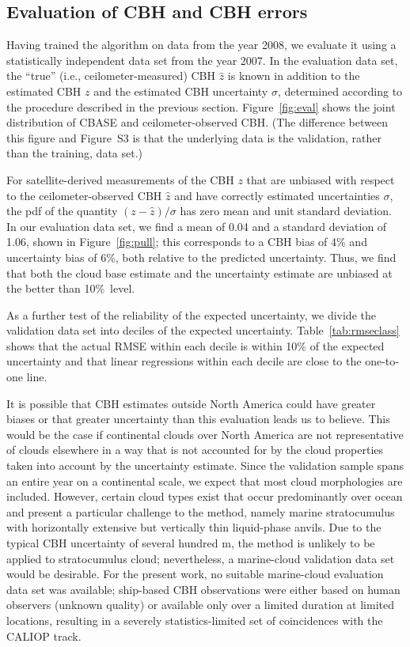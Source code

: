 \documentclass[essd,manuscript]{copernicus}\usepackage[]{graphicx}\usepackage[]{color}
\begin{document}
\subsection{Evaluation of CBH and CBH errors}
\label{sec:algorithm:eval}




Having trained the algorithm on data from the year 2008, we evaluate it using a
statistically independent data set from the year 2007.  In the evaluation data
set, the ``true'' (i.e., ceilometer-measured) CBH $\hat{z}$
is known in addition to the estimated CBH $z$ and the estimated
CBH uncertainty $\sigma$, determined according to the procedure
described in the previous section.  Figure~\ref{fig:eval} shows the joint
distribution of CBASE and ceilometer-observed CBH.  (The
difference between this figure and Figure~S3 is that the underlying data is the
validation, rather than the training, data set.)

For satellite-derived measurements of the CBH $z$ that are
unbiased with respect to the ceilometer-observed CBH $\hat{z}$
and have correctly estimated uncertainties $\sigma$, the pdf of the quantity
$(z - \hat{z})/\sigma$ has zero mean and unit standard deviation. In our
evaluation data set, we find a mean of 0.04 and a standard deviation of 1.06, shown in Figure~\ref{fig:pull}; this
corresponds to a CBH bias of %
4\%
and uncertainty bias of %
6\%, both relative to the predicted uncertainty.  Thus, we find that both
the cloud base estimate and the uncertainty estimate are unbiased at the better
than 10\%\ level.

As a further test of the reliability of the expected uncertainty, we divide the
validation data set into deciles of the expected uncertainty.
Table~\ref{tab:rmseclass} shows that the actual RMSE within each decile is
within 10\% of the expected uncertainty and that linear regressions within each
decile are close to the one-to-one line.

It is possible that CBH estimates outside North America could have
greater biases or that greater uncertainty than this evaluation leads us to
believe.  This would be the case if continental clouds over North America are
not representative of clouds elsewhere in a way that is not accounted for by the
cloud properties taken into account by the uncertainty estimate.  Since the
validation sample spans an entire year on a continental scale, we expect that
most cloud morphologies are included.  However, certain cloud types exist that
occur predominantly over ocean and present a particular challenge to the method,
namely marine stratocumulus with horizontally extensive but vertically thin
liquid-phase anvils.  Due to the typical CBH uncertainty of
several hundred m, the method is unlikely to be applied to stratocumulus cloud;
nevertheless, a marine-cloud validation data set would be desirable.  For the
present work, no suitable marine-cloud evaluation data set was available;
ship-based CBH observations were either based on human observers
(unknown quality) or available only over a limited duration at limited
locations, resulting in a severely statistics-limited set of coincidences with
the CALIOP track.
\end{document}
